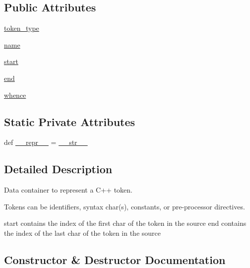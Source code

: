 \subsection*{Public Attributes}
\begin{DoxyCompactItemize}
\item 
\mbox{\hyperlink{classscripts_1_1generator_1_1cpp_1_1tokenize_1_1_token_ae7baace476aa111c1cb9ab9a79597a94}{token\+\_\+type}}
\item 
\mbox{\hyperlink{classscripts_1_1generator_1_1cpp_1_1tokenize_1_1_token_aaf64323e624684c8a7255d948ab98267}{name}}
\item 
\mbox{\hyperlink{classscripts_1_1generator_1_1cpp_1_1tokenize_1_1_token_a78ac70cb8204897b044f04d8c42d4b95}{start}}
\item 
\mbox{\hyperlink{classscripts_1_1generator_1_1cpp_1_1tokenize_1_1_token_a38569d51b12b9986d02242e878825083}{end}}
\item 
\mbox{\hyperlink{classscripts_1_1generator_1_1cpp_1_1tokenize_1_1_token_af13db349aa81646a5c2cbfc41be99044}{whence}}
\end{DoxyCompactItemize}
\subsection*{Static Private Attributes}
\begin{DoxyCompactItemize}
\item 
def \mbox{\hyperlink{classscripts_1_1generator_1_1cpp_1_1tokenize_1_1_token_a07155a65fa76f8b57a8d1ccbd46d38a5}{\+\_\+\+\_\+repr\+\_\+\+\_\+}} = \mbox{\hyperlink{classscripts_1_1generator_1_1cpp_1_1tokenize_1_1_token_aa18ee07288755fc3515e36fadcfbc9eb}{\+\_\+\+\_\+str\+\_\+\+\_\+}}
\end{DoxyCompactItemize}


\subsection{Detailed Description}
\begin{DoxyVerb}Data container to represent a C++ token.

Tokens can be identifiers, syntax char(s), constants, or
pre-processor directives.

start contains the index of the first char of the token in the source
end contains the index of the last char of the token in the source
\end{DoxyVerb}
 

\subsection{Constructor \& Destructor Documentation}
\mbox{\label{classscripts_1_1generator_1_1cpp_1_1tokenize_1_1_token_a2b86aede9e7e3c614cf75503da3a73ba}} 
